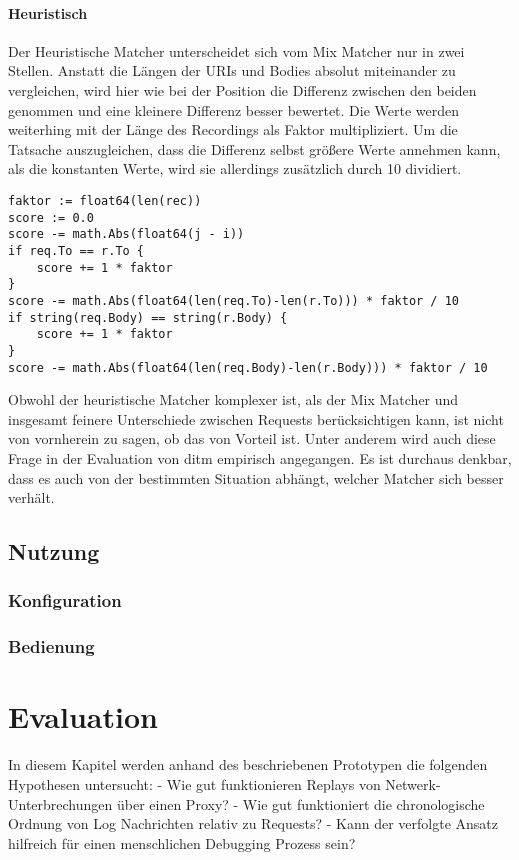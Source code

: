 \documentclass[a4paper]{report}
\begin{document}
\subsubsection{Heuristisch}
Der Heuristische Matcher unterscheidet sich vom Mix Matcher nur in zwei Stellen. Anstatt die Längen der URIs und Bodies
absolut miteinander zu vergleichen, wird hier wie bei der Position die Differenz zwischen den beiden genommen und eine kleinere
Differenz besser bewertet. Die Werte werden weiterhing mit der Länge des Recordings als Faktor multipliziert. Um die Tatsache
auszugleichen, dass die Differenz selbst größere Werte annehmen kann, als die konstanten Werte, wird sie allerdings zusätzlich
durch 10 dividiert.
\begin{verbatim}
faktor := float64(len(rec))
score := 0.0
score -= math.Abs(float64(j - i))
if req.To == r.To {
    score += 1 * faktor
}
score -= math.Abs(float64(len(req.To)-len(r.To))) * faktor / 10
if string(req.Body) == string(r.Body) {
    score += 1 * faktor
}
score -= math.Abs(float64(len(req.Body)-len(r.Body))) * faktor / 10
\end{verbatim}
Obwohl der heuristische Matcher komplexer ist, als der Mix Matcher und insgesamt feinere Unterschiede zwischen Requests
berücksichtigen kann, ist nicht von vornherein zu sagen, ob das von Vorteil ist. Unter anderem wird auch diese Frage in
der Evaluation von ditm empirisch angegangen. Es ist durchaus denkbar, dass es auch von der bestimmten Situation abhängt,
welcher Matcher sich besser verhält.
\section{Nutzung}
\subsection{Konfiguration}
\subsection{Bedienung}

\chapter{Evaluation}
In diesem Kapitel werden anhand des beschriebenen Prototypen die folgenden Hypothesen untersucht:
- Wie gut funktionieren Replays von Netwerk-Unterbrechungen über einen Proxy?
- Wie gut funktioniert die chronologische Ordnung von Log Nachrichten relativ zu Requests?
- Kann der verfolgte Ansatz hilfreich für einen menschlichen Debugging Prozess sein?
\end{document}
